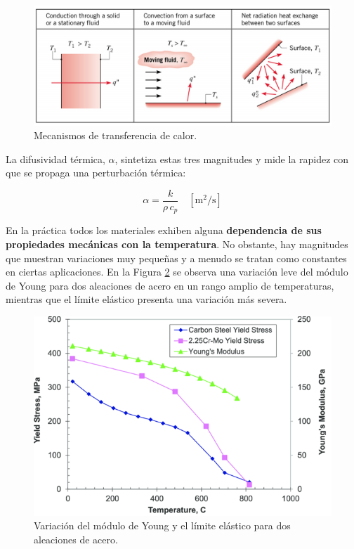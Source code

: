 \begin{figure}[h!]
    \centering
    \includegraphics[width=0.9\linewidth]{imgs/calor.png}
    \caption{Mecanismos de transferencia de calor.\cite{incrop}}
    \label{calors}
\end{figure}

La difusividad térmica, \(\alpha\), sintetiza estas tres magnitudes y mide la rapidez con que se propaga una perturbación térmica:

\begin{equation}
  \alpha = \frac{k}{\rho\,c_p}
  \quad [\mathrm{m^2/s}]
\end{equation}

En la práctica todos los materiales exhiben alguna \textbf{dependencia de sus propiedades mecánicas con la temperatura}. No obstante, hay magnitudes que muestran variaciones muy pequeñas y a menudo se tratan como constantes en ciertas aplicaciones. En la Figura \ref{fig:ttt} se observa una variación leve del módulo de Young para dos aleaciones de acero en un rango amplio de temperaturas, mientras que el límite elástico presenta una variación más severa.

\begin{figure}[h!]
    \centering
    \includegraphics[width=0.7\linewidth]{imgs/tempgraf.png}
    \caption{Variación del módulo de Young y el límite elástico para dos aleaciones de acero.\cite{tempyoung}}
    \label{fig:ttt}
\end{figure}

